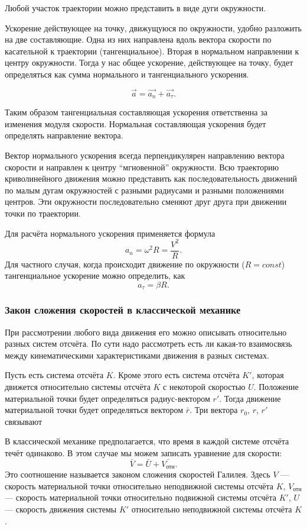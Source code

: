 Любой участок траектории можно представить в виде дуги окружности.

Ускорение действующее на точку, движущуюся по окружности, удобно разложить на
две составляющие. Одна из них направлена вдоль вектора скорости по касательной
к траектории (тангенциальное). Вторая в нормальном направлении к центру
окружности. Тогда у нас общее ускорение, действующее на точку, будет
определяться как сумма нормального и тангенциального ускорения.

\[
	\vec{a} = \vec{a_n} + \vec{a_\tau}
	.\]

Таким образом тангенциальная составляющая ускорения ответственна за изменения
модуля скорости. Нормальная составляющая ускорения будет определять направление
вектора.

Вектор нормального ускорения всегда перпендикулярен направлению вектора
скорости и направлен к центру ``мгновенной'' окружности. Всю траекторию
криволинейного движения можно представить как последовательность движений по
малым дугам окружностей с разными радиусами и разными положениями центров. Эти
окружности последовательно сменяют друг друга при движении точки по траектории.

Для расчёта нормального ускорения применяется формула \[
	a_n = \omega^2 R = \frac{V^2 }{R}
	.\] Для частного случая, когда происходит движение по окружности (\( R =
const \)) тангенциальное ускорение можно определить, как \[
	a_\tau = \beta R
	.\]

\subsubsection{Закон сложения скоростей в классической механике}

При рассмотрении любого вида движения его можно описывать относительно разных
систем отсчёта. По сути надо рассмотреть есть ли какая-то взаимосвязь между
кинематическими характеристиками движения в разных системах.

Пусть есть система отсчёта \( K \). Кроме этого есть система отсчёта \( K' \),
которая движется относительно системы отсчёта \( K \) с некоторой скоростью \(
U \). Положение материальной точки будет определяться радиус-вектором \( r' \).
Тогда движение материальной точки будет определяться вектором \( \bar{r} \).
Три вектора \( r_0 \), \( r \), \( r' \) связывают

В классической механике предполагается, что время в каждой системе отсчёта
течёт одинаково. В этом случае мы можем записать уравнение для скорости: \[
	\bar{V} = \bar{U} + \bar{V_\text{отн}}
	.\] Это соотношение называется законом сложения скоростей Галилея. Здесь \(
V \) --- скорость материальной точки относительно неподвижной системы отсчёта
\( K \), \( V_\text{отн} \) --- скорость материальной точки относительно
подвижной системы отсчёта \( K' \), \( U \) --- скорость движения системы \(
K' \) относительно неподвижной системы отсчёта \( K \).

